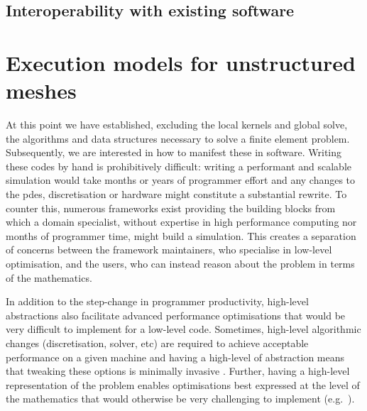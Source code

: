 \documentclass[thesis]{subfiles}
\begin{document}
\subsection{Interoperability with existing software}




\section{Execution models for unstructured meshes}

At this point we have established, excluding the local kernels and global solve, the algorithms and data structures necessary to solve a finite element problem.
Subsequently, we are interested in how to manifest these in software.
Writing these codes by hand is prohibitively difficult: writing a performant and scalable simulation would take months or years of programmer effort and any changes to the \glspl{pde}, discretisation or hardware might constitute a substantial rewrite.
To counter this, numerous frameworks exist providing the building blocks from which a domain specialist, without expertise in high performance computing nor months of programmer time, might build a simulation.
This creates a separation of concerns between the framework maintainers, who specialise in low-level optimisation, and the users, who can instead reason about the problem in terms of the mathematics.

In addition to the step-change in programmer productivity, high-level abstractions also facilitate advanced performance optimisations that would be very difficult to implement for a low-level code.
Sometimes, high-level algorithmic changes (discretisation, solver, etc) are required to achieve acceptable performance on a given machine and having a high-level of abstraction means that tweaking these options is minimally invasive \parencite{betteridgeCodeGenerationProductive2021}.
Further, having a high-level representation of the problem enables optimisations best expressed at the level of the mathematics that would otherwise be very challenging to implement (e.g.~\cite{homolyaExposingExploitingStructure2017}).
\end{document}
